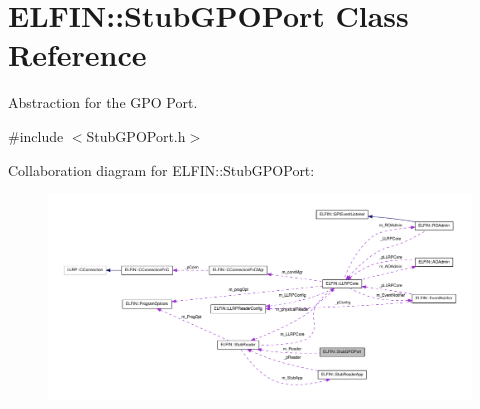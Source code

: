 \hypertarget{class_e_l_f_i_n_1_1_stub_g_p_o_port}{\section{E\-L\-F\-I\-N\-:\-:Stub\-G\-P\-O\-Port Class Reference}
\label{class_e_l_f_i_n_1_1_stub_g_p_o_port}
}


Abstraction for the G\-P\-O Port.  




{\ttfamily \#include $<$Stub\-G\-P\-O\-Port.\-h$>$}



Collaboration diagram for E\-L\-F\-I\-N\-:\-:Stub\-G\-P\-O\-Port\-:
\nopagebreak
\begin{figure}[H]
\begin{center}
\leavevmode
\includegraphics[width=350pt]{class_e_l_f_i_n_1_1_stub_g_p_o_port__coll__graph}
\end{center}
\end{figure}
